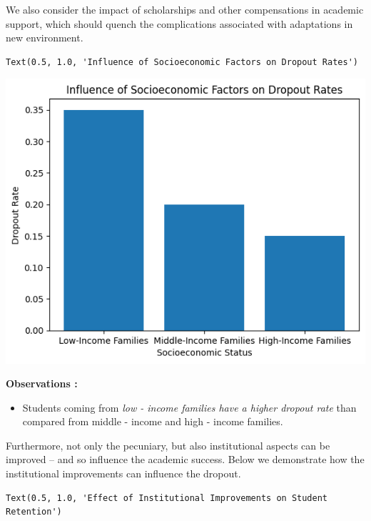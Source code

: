 \documentclass[
  letterpaper,
  DIV=11,
  numbers=noendperiod]{scrartcl}
\providecommand{\tightlist}{%
  \setlength{\itemsep}{0pt}\setlength{\parskip}{0pt}}\usepackage{longtable,booktabs,array}
\begin{document}
We also consider the impact of scholarships and other compensations in
academic support, which should quench the complications associated with
adaptations in new environment.

\begin{verbatim}
Text(0.5, 1.0, 'Influence of Socioeconomic Factors on Dropout Rates')
\end{verbatim}

\includegraphics{report_AzadhdhinNedalYunisAlFraijat_files/figure-pdf/cell-11-output-2.png}

\textbf{Observations :}

\begin{itemize}
\tightlist
\item
  Students coming from \emph{low - income families have a higher dropout
  rate} than compared from middle - income and high - income families.
\end{itemize}

Furthermore, not only the pecuniary, but also institutional aspects can
be improved -- and so influence the academic success. Below we
demonstrate how the institutional improvements can influence the
dropout.

\begin{verbatim}
Text(0.5, 1.0, 'Effect of Institutional Improvements on Student Retention')
\end{verbatim}
\end{document}
